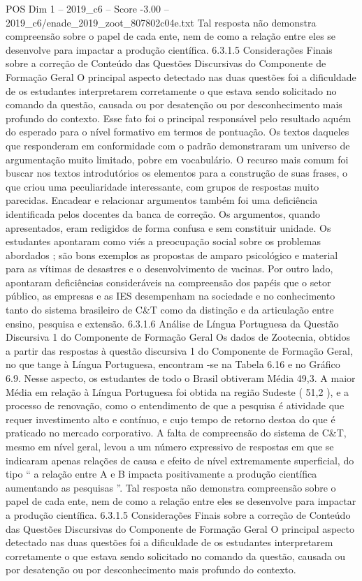 \begin{textsample}{POS Dim 1 – 2019\_c6 – Score -3.00 – 2019\_c6/enade\_2019\_zoot\_807802c04e.txt}
Tal resposta não demonstra compreensão sobre o papel de cada ente, nem de como a relação entre eles se desenvolve para impactar a produção científica. 6.3.1.5 Considerações Finais sobre a correção de Conteúdo das Questões Discursivas do Componente de Formação Geral O principal aspecto detectado nas duas questões foi a dificuldade de os estudantes interpretarem corretamente o que estava sendo solicitado no comando da questão, causada ou por desatenção ou por desconhecimento mais profundo do contexto.
Esse fato foi o principal responsável pelo resultado aquém do esperado para o nível formativo em termos de pontuação.
Os textos daqueles que responderam em conformidade com o padrão demonstraram um universo de argumentação muito limitado, pobre em vocabulário.
O recurso mais comum foi buscar nos textos introdutórios os elementos para a construção de suas frases, o que criou uma peculiaridade interessante, com grupos de respostas muito parecidas.
Encadear e relacionar argumentos também foi uma deficiência identificada pelos docentes da banca de correção.
Os argumentos, quando apresentados, eram redigidos de forma confusa e sem constituir unidade.
Os estudantes apontaram como viés a preocupação social sobre os problemas abordados ; são bons exemplos as propostas de amparo psicológico e material para as vítimas de desastres e o desenvolvimento de vacinas.
Por outro lado, apontaram deficiências consideráveis na compreensão dos papéis que o setor público, as empresas e as IES desempenham na sociedade e no conhecimento tanto do sistema brasileiro de C\&T como da distinção e da articulação entre ensino, pesquisa e extensão. 6.3.1.6 Análise de Língua Portuguesa da Questão Discursiva 1 do Componente de Formação Geral Os dados de Zootecnia, obtidos a partir das respostas à questão discursiva 1 do Componente de Formação Geral, no que tange à Língua Portuguesa, encontram -se na Tabela 6.16 e no Gráfico 6.9.
Nesse aspecto, os estudantes de todo o Brasil obtiveram Média 49,3.
A maior Média em relação à Língua Portuguesa foi obtida na região Sudeste ( 51,2 ), e a processo de renovação, como o entendimento de que a pesquisa é atividade que requer investimento alto e contínuo, e cujo tempo de retorno destoa do que é praticado no mercado corporativo.
A falta de compreensão do sistema de C\&T, mesmo em nível geral, levou a um número expressivo de respostas em que se indicaram apenas relações de causa e efeito de nível extremamente superficial, do tipo “ a relação entre A e B impacta positivamente a produção científica aumentando as pesquisas ”.
Tal resposta não demonstra compreensão sobre o papel de cada ente, nem de como a relação entre eles se desenvolve para impactar a produção científica. 6.3.1.5 Considerações Finais sobre a correção de Conteúdo das Questões Discursivas do Componente de Formação Geral O principal aspecto detectado nas duas questões foi a dificuldade de os estudantes interpretarem corretamente o que estava sendo solicitado no comando da questão, causada ou por desatenção ou por desconhecimento mais profundo do contexto.

\end{textsample}
